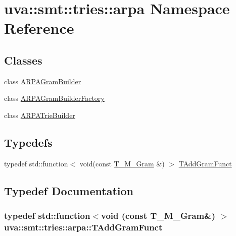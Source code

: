 \hypertarget{namespaceuva_1_1smt_1_1tries_1_1arpa}{}\section{uva\+:\+:smt\+:\+:tries\+:\+:arpa Namespace Reference}
\label{namespaceuva_1_1smt_1_1tries_1_1arpa}
\subsection*{Classes}
\begin{DoxyCompactItemize}
\item 
class \hyperlink{classuva_1_1smt_1_1tries_1_1arpa_1_1_a_r_p_a_gram_builder}{A\+R\+P\+A\+Gram\+Builder}
\item 
class \hyperlink{classuva_1_1smt_1_1tries_1_1arpa_1_1_a_r_p_a_gram_builder_factory}{A\+R\+P\+A\+Gram\+Builder\+Factory}
\item 
class \hyperlink{classuva_1_1smt_1_1tries_1_1arpa_1_1_a_r_p_a_trie_builder}{A\+R\+P\+A\+Trie\+Builder}
\end{DoxyCompactItemize}
\subsection*{Typedefs}
\begin{DoxyCompactItemize}
\item 
typedef std\+::function$<$ void(const \hyperlink{structuva_1_1smt_1_1tries_1_1mgrams_1_1_t___m___gram}{T\+\_\+\+M\+\_\+\+Gram} \&) $>$ \hyperlink{namespaceuva_1_1smt_1_1tries_1_1arpa_a9af1fc82824b7244f557bc5a265ce3f0}{T\+Add\+Gram\+Funct}
\end{DoxyCompactItemize}


\subsection{Typedef Documentation}
\hypertarget{namespaceuva_1_1smt_1_1tries_1_1arpa_a9af1fc82824b7244f557bc5a265ce3f0}{}
\subsubsection[{T\+Add\+Gram\+Funct}]{\setlength{\rightskip}{0pt plus 5cm}typedef std\+::function$<$void (const {\bf T\+\_\+\+M\+\_\+\+Gram}\&) $>$ {\bf uva\+::smt\+::tries\+::arpa\+::\+T\+Add\+Gram\+Funct}}\label{namespaceuva_1_1smt_1_1tries_1_1arpa_a9af1fc82824b7244f557bc5a265ce3f0}
